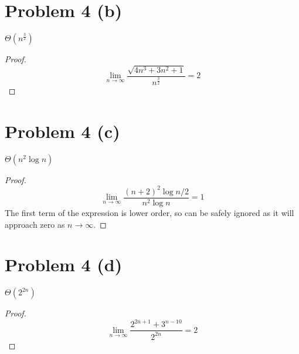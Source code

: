 \documentclass{article}
\newenvironment{problem}[1]{
  \nobreak\section*{Problem #1}
}{}
\newcommand*{\bigTheta}[1]{\ensuremath{\Theta\left(#1\right)}}
\begin{document}
  \begin{problem}{4 (b)}
    \begin{center}
      \bigTheta{n^{\frac{3}{2}}}
    \end{center}
    
    \begin{proof}
      \begin{equation*}
        \lim_{n\to\infty} \frac{\sqrt{4n^3 + 3n^2 + 1}}{n^{\frac{3}{2}}} = 2
      \end{equation*}
    \end{proof}
  \end{problem}

  \begin{problem}{4 (c)}
    \begin{center}
      \bigTheta{n^2\log{n}}
    \end{center}

    \begin{proof}
      \begin{equation*}
        \lim_{n\to\infty} \frac{(n + 2)^2\log{n/2}}{n^2\log{n}} = 1
      \end{equation*}
      The first term of the expression is lower order, so can be safely
      ignored as it will approach zero as $n \to \infty$.
    \end{proof}
  \end{problem}

  \begin{problem}{4 (d)}
    \begin{center}
      \bigTheta{2^{2n}}
    \end{center}

    \begin{proof}
      \begin{equation*}
        \lim_{n\to\infty} \frac{2^{2n+1}+3^{n-10}}{2^{2n}} = 2
      \end{equation*}
    \end{proof}
  \end{problem}
\end{document}
